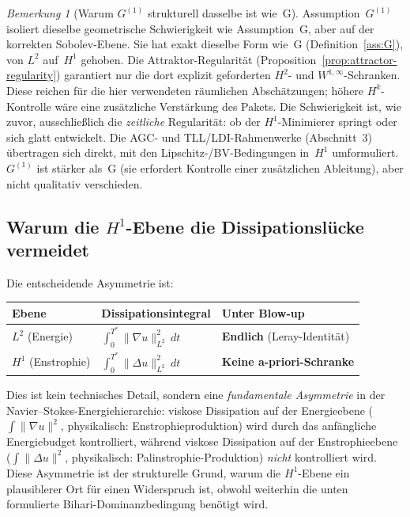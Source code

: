 \documentclass[12pt,a4paper]{article}
\theoremstyle{definition}
\theoremstyle{plain}
\theoremstyle{remark}
\newtheorem{remark}[definition]{Bemerkung}
\begin{document}
\begin{remark}[Warum $G^{(1)}$ strukturell dasselbe ist wie~G]
Assumption~$G^{(1)}$ isoliert dieselbe geometrische Schwierigkeit wie
Assumption~G, aber auf der korrekten Sobolev-Ebene.
Sie hat exakt dieselbe Form wie~G
(Definition~\ref{ass:G}), von $L^2$ auf~$H^1$ gehoben. Die
Attraktor-Regularität
(Proposition~\ref{prop:attractor-regularity}) garantiert nur die dort
explizit geforderten $H^2$- und $W^{1,\infty}$-Schranken. Diese reichen
für die hier verwendeten räumlichen Abschätzungen; höhere $H^k$-Kontrolle
wäre eine zusätzliche Verstärkung des Pakets.
Die Schwierigkeit ist, wie zuvor, ausschließlich die \emph{zeitliche}
Regularität: ob der $H^1$-Minimierer springt oder sich glatt entwickelt.
Die AGC- und TLL/LDI-Rahmenwerke (Abschnitt~3) übertragen sich direkt, mit
den Lipschitz-/BV-Bedingungen in~$H^1$ umformuliert.
$G^{(1)}$ ist stärker als~G (sie erfordert Kontrolle einer
zusätzlichen Ableitung), aber nicht qualitativ verschieden.
\end{remark}

\subsection{Warum die \texorpdfstring{$H^1$}{H1}-Ebene die Dissipationslücke vermeidet}

Die entscheidende Asymmetrie ist:

\begin{center}
\begin{tabular}{lll}
\hline
\textbf{Ebene} & \textbf{Dissipationsintegral} & \textbf{Unter Blow-up} \\
\hline
$L^2$\; (Energie)
  & $\int_0^{T^*}\|\nabla u\|_{L^2}^2\,dt$
  & \textbf{Endlich} (Leray-Identität) \\
$H^1$\; (Enstrophie)
  & $\int_0^{T^*}\|\Delta u\|_{L^2}^2\,dt$
  & \textbf{Keine a-priori-Schranke} \\
\hline
\end{tabular}
\end{center}

\noindent
Dies ist kein technisches Detail, sondern eine \emph{fundamentale Asymmetrie}
in der Navier--Stokes-Energiehierarchie: viskose Dissipation auf der
Energieebene ($\int\|\nabla u\|^2$, physikalisch: Enstrophieproduktion)
wird durch das anfängliche Energiebudget kontrolliert, während viskose Dissipation
auf der Enstrophieebene ($\int\|\Delta u\|^2$, physikalisch: Palinstrophie-Produktion) \emph{nicht} kontrolliert wird. Diese Asymmetrie ist der strukturelle Grund,
warum die $H^1$-Ebene ein plausiblerer Ort für einen Widerspruch ist,
obwohl weiterhin die unten formulierte Bihari-Dominanzbedingung benötigt wird.
\end{document}
